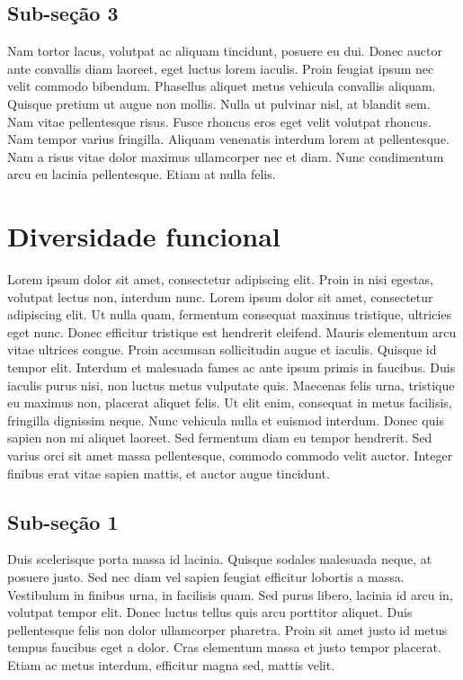 \documentclass[]{book}
\begin{document}
\hypertarget{sub-seuxe7uxe3o-3-4}{%
\section{Sub-seção 3}\label{sub-seuxe7uxe3o-3-4}}

Nam tortor lacus, volutpat ac aliquam tincidunt, posuere eu dui. Donec auctor ante convallis diam laoreet, eget luctus lorem iaculis. Proin feugiat ipsum nec velit commodo bibendum. Phasellus aliquet metus vehicula convallis aliquam. Quisque pretium ut augue non mollis. Nulla ut pulvinar nisl, at blandit sem. Nam vitae pellentesque risus. Fusce rhoncus eros eget velit volutpat rhoncus. Nam tempor varius fringilla. Aliquam venenatis interdum lorem at pellentesque. Nam a risus vitae dolor maximus ullamcorper nec et diam. Nunc condimentum arcu eu lacinia pellentesque. Etiam at nulla felis.

\hypertarget{diversidade-funcional}{%
\chapter{Diversidade funcional}\label{diversidade-funcional}}

Lorem ipsum dolor sit amet, consectetur adipiscing elit. Proin in nisi egestas, volutpat lectus non, interdum nunc. Lorem ipsum dolor sit amet, consectetur adipiscing elit. Ut nulla quam, fermentum consequat maximus tristique, ultricies eget nunc. Donec efficitur tristique est hendrerit eleifend. Mauris elementum arcu vitae ultrices congue. Proin accumsan sollicitudin augue et iaculis. Quisque id tempor elit. Interdum et malesuada fames ac ante ipsum primis in faucibus. Duis iaculis purus nisi, non luctus metus vulputate quis. Maecenas felis urna, tristique eu maximus non, placerat aliquet felis. Ut elit enim, consequat in metus facilisis, fringilla dignissim neque. Nunc vehicula nulla et euismod interdum. Donec quis sapien non mi aliquet laoreet. Sed fermentum diam eu tempor hendrerit. Sed varius orci sit amet massa pellentesque, commodo commodo velit auctor. Integer finibus erat vitae sapien mattis, et auctor augue tincidunt.

\hypertarget{sub-seuxe7uxe3o-1-5}{%
\section{Sub-seção 1}\label{sub-seuxe7uxe3o-1-5}}

Duis scelerisque porta massa id lacinia. Quisque sodales malesuada neque, at posuere justo. Sed nec diam vel sapien feugiat efficitur lobortis a massa. Vestibulum in finibus urna, in facilisis quam. Sed purus libero, lacinia id arcu in, volutpat tempor elit. Donec luctus tellus quis arcu porttitor aliquet. Duis pellentesque felis non dolor ullamcorper pharetra. Proin sit amet justo id metus tempus faucibus eget a dolor. Cras elementum massa et justo tempor placerat. Etiam ac metus interdum, efficitur magna sed, mattis velit.
\end{document}
